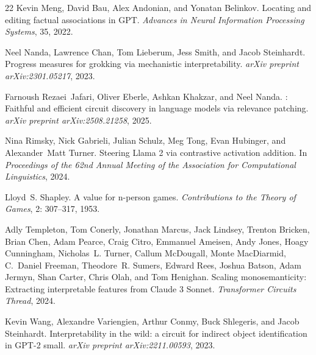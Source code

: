 \documentclass[11pt]{article}
\begin{document}
\begin{thebibliography}{22}
Kevin Meng, David Bau, Alex Andonian, and Yonatan Belinkov.
\newblock Locating and editing factual associations in {GPT}.
\newblock \emph{Advances in Neural Information Processing Systems}, 35, 2022.

Neel Nanda, Lawrence Chan, Tom Lieberum, Jess Smith, and Jacob Steinhardt.
\newblock Progress measures for grokking via mechanistic interpretability.
\newblock \emph{arXiv preprint arXiv:2301.05217}, 2023.

Farnoush Rezaei~Jafari, Oliver Eberle, Ashkan Khakzar, and Neel Nanda.
: Faithful and efficient circuit discovery in language models
  via relevance patching.
\newblock \emph{arXiv preprint arXiv:2508.21258}, 2025.

Nina Rimsky, Nick Gabrieli, Julian Schulz, Meg Tong, Evan Hubinger, and
  Alexander~Matt Turner.
\newblock Steering {Llama} 2 via contrastive activation addition.
\newblock In \emph{Proceedings of the 62nd Annual Meeting of the Association
  for Computational Linguistics}, 2024.

Lloyd~S. Shapley.
\newblock A value for n-person games.
\newblock \emph{Contributions to the Theory of Games}, 2: 307--317,
  1953.

Adly Templeton, Tom Conerly, Jonathan Marcus, Jack Lindsey, Trenton Bricken,
  Brian Chen, Adam Pearce, Craig Citro, Emmanuel Ameisen, Andy Jones, Hoagy
  Cunningham, Nicholas~L. Turner, Callum McDougall, Monte MacDiarmid, C.~Daniel
  Freeman, Theodore~R. Sumers, Edward Rees, Joshua Batson, Adam Jermyn, Shan
  Carter, Chris Olah, and Tom Henighan.
\newblock Scaling monosemanticity: Extracting interpretable features from
  {Claude} 3 {Sonnet}.
\newblock \emph{Transformer Circuits Thread}, 2024.

Kevin Wang, Alexandre Variengien, Arthur Conmy, Buck Shlegeris, and Jacob
  Steinhardt.
\newblock Interpretability in the wild: a circuit for indirect object
  identification in {GPT}-2 small.
\newblock \emph{arXiv preprint arXiv:2211.00593}, 2023.


\end{thebibliography}
\end{document}
